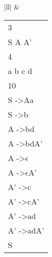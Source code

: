 \begin{table}[h!]
\begin{tabular}{|ll|}
                                                                                                                                   & \begin{tabular}[c]{@{}l@{}}3\\ S A A' \\ 4\\ a b c d \\ 10\\ S -\textgreater Aa\\ S -\textgreater b\\ A -\textgreater bd\\ A -\textgreater bdA'\\ A -\textgreater $\epsilon$\\ A -\textgreater $\epsilon$A'\\ A' -\textgreater c\\ A' -\textgreater cA'\\ A' -\textgreater ad\\ A' -\textgreater adA'\\ S\end{tabular}                                                                                                                                                                                                                                  \\ \hline

\end{tabular}
\end{table}

